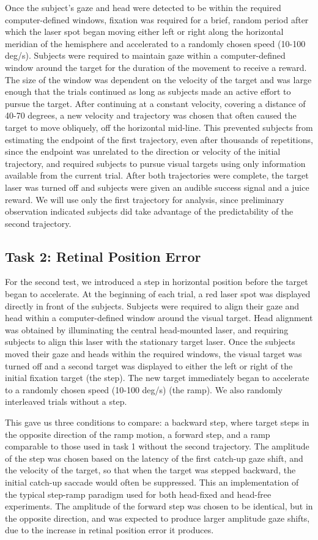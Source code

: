 \documentclass[12pt]{article}
\begin{document}
Once the subject's gaze and head were detected to be within the required computer-defined windows, fixation was required for a brief, random period after which the laser spot began moving either left or right along the horizontal meridian of the hemisphere and accelerated to a randomly chosen speed (10-100 deg/s). Subjects were required to maintain gaze within a computer-defined window around the target for the duration of the movement to receive a reward. The size of the window was dependent on the velocity of the target and was large enough that the trials continued as long as subjects made an active effort to pursue the target. After continuing at a constant velocity, covering a distance of 40-70 degrees, a new velocity and trajectory was chosen that often caused the target to move obliquely, off the horizontal mid-line. This prevented subjects from estimating the endpoint of the first trajectory, even after thousands of repetitions, since the endpoint was unrelated to the direction or velocity of the initial trajectory, and required subjects to pursue visual targets using only information available from the current trial. After both trajectories were complete, the target laser was turned off and subjects were given an audible success signal and a juice reward. We will use only the first trajectory for analysis, since preliminary observation indicated subjects did take advantage of the predictability of the second trajectory. 

\subsection{Task 2: Retinal Position Error}
For the second test, we introduced a step in horizontal position before the target began to accelerate. At the beginning of each trial, a red laser spot was displayed directly in front of the subjects. Subjects were required to align their gaze and head within a computer-defined window around the visual target. Head alignment was obtained by illuminating the central head-mounted laser, and requiring subjects to align this laser with the stationary target laser. Once the subjects moved their gaze and heads within the required windows, the visual target was turned off and a second target was displayed to either the left or right of the initial fixation target (the step). The new target immediately began to accelerate to a randomly chosen speed (10-100 deg/s) (the ramp). We also randomly interleaved trials without a step. 

This gave us three conditions to compare: a backward step, where target steps in the opposite direction of the ramp motion, a forward step, and a ramp comparable to those used in task 1 without the second trajectory. The amplitude of the step was chosen based on the latency of the first catch-up gaze shift, and the velocity of the target, so that when the target was stepped backward, the initial catch-up saccade would often be suppressed. This an implementation of the typical step-ramp paradigm used for both head-fixed and head-free experiments. The amplitude of the forward step was chosen to be identical, but in the opposite direction, and was expected to produce larger amplitude gaze shifts, due to the increase in retinal position error it produces.
\end{document}
